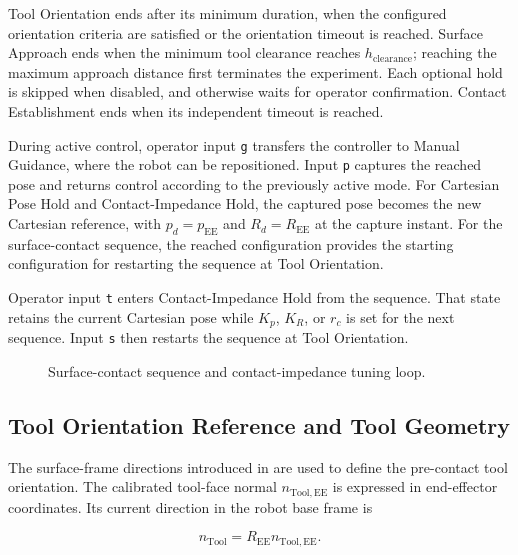 Tool Orientation ends after its minimum duration, when the configured
orientation criteria are satisfied or the orientation timeout is reached.
Surface Approach ends when the minimum tool clearance reaches
\mbox{\(h_{\mathrm{clearance}}\)}; reaching the maximum approach distance
first terminates the experiment. Each optional hold is skipped when disabled,
and otherwise waits for operator confirmation. Contact Establishment ends when
its independent timeout is reached.

During active control, operator input \texttt{g} transfers the controller to
Manual Guidance, where the robot can be repositioned. Input \texttt{p} captures
the reached pose and returns control according to the previously active mode.
For Cartesian Pose Hold and Contact-Impedance Hold, the captured pose becomes
the new Cartesian reference, with \mbox{\(p_d=p_{\mathrm{EE}}\)} and
\mbox{\(R_d=R_{\mathrm{EE}}\)} at the capture instant. For the surface-contact
sequence, the reached configuration provides the starting configuration for
restarting the sequence at Tool Orientation.

Operator input \texttt{t} enters Contact-Impedance Hold from the sequence.
That state retains the current Cartesian pose while \mbox{\(K_p\)},
\mbox{\(K_R\)}, or \mbox{\(r_c\)} is set for the next sequence. Input
\texttt{s} then restarts the sequence at Tool Orientation.

\begin{figure}[H]
  \centering
  
  \caption{Surface-contact sequence and contact-impedance tuning loop.}
  \label{fig:phase_flow_chart}
\end{figure}

\subsection{Tool Orientation Reference and Tool Geometry}
\label{subsec:implemented_surface_task_frame}
\label{sec:surface_task_plane}
\label{sec:tool_orientation_given_surface}
\label{sec:tool_contact_geometry}

The surface-frame directions introduced in
\mbox{} are used to define the pre-contact tool
orientation. The calibrated tool-face normal \mbox{\(n_{\mathrm{Tool,EE}}\)} is
expressed in end-effector coordinates. Its current direction in the robot base
frame is

\begin{equation}
n_{\mathrm{Tool}}=R_{\mathrm{EE}}n_{\mathrm{Tool,EE}}.
\label{eq:implementation_current_tool_normal}
\end{equation}


